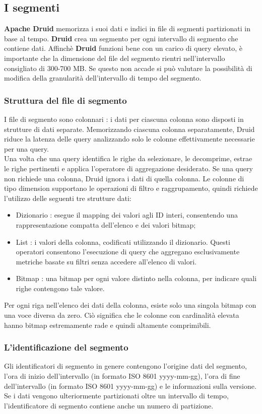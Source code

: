 \documentclass{article}
\begin{document}
\subsection{I segmenti}
\textbf{Apache Druid} memorizza i suoi dati e indici in file di segmenti partizionati in base al tempo.
\textbf{Druid} crea un segmento per ogni intervallo di segmento che contiene dati.
Affinchè \textbf{Druid} funzioni bene  con un carico di query elevato, è importante che la dimensione del file del segmento rientri nell'intervallo consigliato di 300-700 MB. Se questo non accade si può valutare la possibilità di modifica della granularità dell'intervallo di tempo del segmento.
\subsubsection{Struttura del file di segmento}
I file di segmento sono colonnari : i dati per ciascuna colonna sono disposti in strutture di dati separate. Memorizzando ciascuna colonna separatamente, Druid riduce la latenza delle query analizzando solo le colonne effettivamente necessarie per una query. \\
Una volta che una query identifica le righe da selezionare, le decomprime, estrae le righe pertinenti e applica l'operatore di aggregazione desiderato.  Se una query non richiede una colonna, Druid ignora i dati di quella colonna.
Le colonne di tìpo dimension supportano le operazioni di filtro e raggrupamento, quindi richiede l'utilizzo delle seguenti tre strutture dati: 
\begin{itemize}
    \item Dizionario : esegue il mapping dei valori agli ID interi, consentendo una rappresentazione compatta dell'elenco e dei valori bitmap;
    \item List : i valori della colonna, codificati utilizzando il dizionario.
    Questi operatori consentono l'esecuzione di query che aggregano esclusivamente metriche basate su filtri senza accedere all'elenco di valori.
    \item Bitmap : una bitmap per ogni valore distinto nella colonna, per indicare quali righe contengono tale valore.
\end{itemize}
Per ogni riga nell'elenco dei dati della colonna, esiste solo una singola bitmap con una voce diversa da zero. Ciò significa che le colonne con cardinalità elevata hanno bitmap estremamente rade e quindi altamente comprimibili. 
\subsubsection{L'identificazione del segmento}
Gli identificatori di segmento in genere contengono l'origine dati del segmento, l'ora di inizio dell'intervallo (in formato ISO 8601 yyyy-mm-gg), l'ora di fine dell'intervallo (in formato ISO 8601 yyyy-mm-gg) e le informazioni sulla versione. Se i dati vengono ulteriormente partizionati oltre un intervallo di tempo, l'identificatore di segmento contiene anche un numero di partizione.
\end{document}
